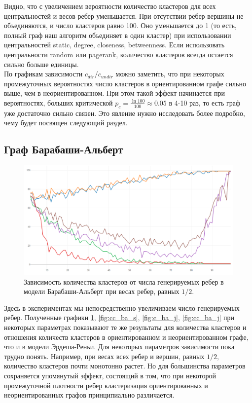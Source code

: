 Видно, что с увеличением вероятности количество кластеров для всех центральностей и весов ребер уменьшается. При отсутствии ребер вершины не объединяются, и число кластеров равно 100. Оно уменьшается до 1 (то есть, полный граф наш алгоритм объединяет в один кластер) при использовании центральностей static, degree, closeness, betweenness. Если использовать центральности random или pagerank, количество кластеров всегда остается сильно больше единицы.\\
	
По графикам зависимости $c_{dir}/c_{undir}$ можно заметить, что при некоторых промежуточных вероятностях число кластеров в ориентированном графе сильно выше, чем в неориентированном. При этом такой эффект начинается при вероятностях, больших критической $p_{c}=\frac{\ln 100}{100}\approx 0.05$ в 4-10 раз, то есть граф уже достаточно сильно связен. Это явление нужно исследовать более подробно, чему будет посвящен следующий раздел.\\

\subsection{Граф Барабаши-Альберт}

\begin{figure}[h!]
	\centering
	\includegraphics[width=\textwidth]{pics/ba_static.png}
	\caption{Зависимость количества кластеров от числа генерируемых ребер в модели Барабаши-Альберт при весах ребер, равных $1/2$.}
	\label{fig:c_ba_s}
\end{figure}

Здесь в экспериментах мы непосредственно увеличиваем число генерируемых ребер. Полученные графики \ref{fig:c_ba_s}, \ref{fig:cc_ba_s}, \ref{fig:c_ba_j}, \ref{fig:cc_ba_j} при некоторых параметрах показывают те же результаты для количества кластеров и отношения количеств кластеров в ориентированном и неориентированном графе, что и в модели Эрдеша-Реньи. Для некоторых параметров зависимости пока трудно понять. Например, при весах всех ребер и вершин, равных $1/2$, количество кластеров почти монотонно растет. Но для большинства параметров сохраняется упомянутый эффект, состоящий в том, что при некоторой промежуточной плотности ребер кластеризация ориентированных и неориентированных графов принципиально различается.

